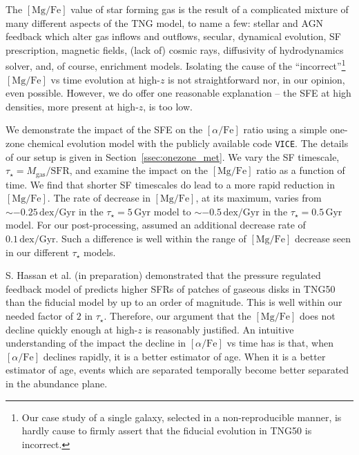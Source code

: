 \documentclass[linenumbers, twocolumn]{aastex631}
\newcommand{\Gyr}{\ensuremath{\textrm{Gyr}}}
\newcommand{\MgFe}{\ensuremath{[\textrm{Mg}/\textrm{Fe}]}}
\newcommand{\alphaFe}{\ensuremath{[\alpha/\textrm{Fe}]}}
\newcommand{\dex}{\ensuremath{\textrm{dex}}}
\begin{document}
The \MgFe{} value of star forming gas is the result of a complicated mixture of many different aspects of the TNG model, to name a few: stellar and AGN feedback which alter gas inflows and outflows, secular, dynamical evolution, SF prescription, magnetic fields, (lack of) cosmic rays, diffusivity of hydrodynamics solver, and, of course, enrichment models. Isolating the cause of the ``incorrect''\footnote{Our case study of a single galaxy, selected in a non-reproducible manner, is hardly cause to firmly assert that the fiducial evolution in TNG50 is incorrect.} \MgFe{} vs time evolution at high-$z$ is not straightforward nor, in our opinion, even possible. However, we do offer one reasonable explanation -- the SFE at high densities, more present at high-$z$, is too low.

We demonstrate the impact of the SFE on the \alphaFe{} ratio using a simple one-zone chemical evolution model with the publicly available code \texttt{VICE}. The details of our setup is given in Section~\ref{ssec:onezone_met}. We vary the SF timescale, $\tau_{\star}=M_{\textrm{gas}}/\textrm{SFR}$, and examine the impact on the \MgFe{} ratio as a function of time. We find that shorter SF timescales do lead to a more rapid reduction in \MgFe{}. The rate of decrease in \MgFe{}, at its maximum, varies from $\sim-0.25\,\dex/\Gyr$ in the $\tau_{\star}=5\,\Gyr$ model to $\sim-0.5\,\dex/\Gyr$ in the $\tau_{\star}=0.5\,\Gyr$ model. For our post-processing, assumed an additional decrease rate of $0.1\,\dex/\Gyr$. Such a difference is well within the range of \MgFe{} decrease seen in our different $\tau_{\star}$ models.

S. Hassan et al. (in preparation) demonstrated that the pressure regulated feedback model of \citet{2022ApJ...936..137O} predicts higher SFRs of patches of gaseous disks in TNG50 than the fiducial model by up to an order of magnitude. This is well within our needed factor of $2$ in $\tau_{\star}$. Therefore, our argument that the \MgFe{} does not decline quickly enough at high-$z$ is reasonably justified. An intuitive understanding of the impact the decline in \alphaFe{} vs time has is that, when \alphaFe{} declines rapidly, it is a better estimator of age. When it is a better estimator of age, events which are separated temporally become better separated in the abundance plane.
\end{document}
